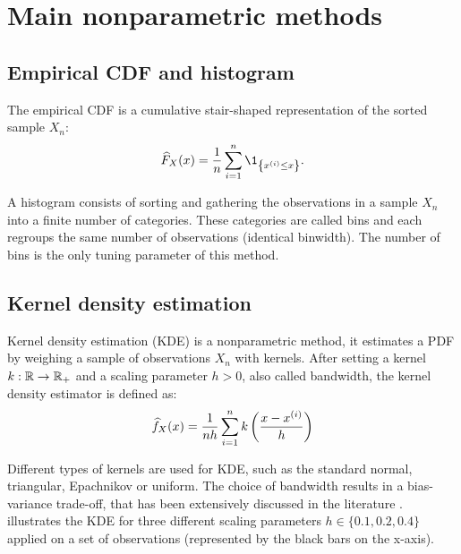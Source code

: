 \section*{Main nonparametric methods}


\subsection*{Empirical CDF and histogram}
The empirical CDF is a cumulative stair-shaped representation of the sorted sample $X_n$:
\begin{equation}
    \what{F}_X(x) = \frac1n \sum_{i=1}^{n} \1_{\left\{x^{(i)} \leq x\right\}}.
\end{equation}

A histogram consists of sorting and gathering the observations in a sample $X_n$ into a finite number of categories. 
These categories are called bins and each regroups the same number of observations (identical binwidth). 
The number of bins is the only tuning parameter of this method.

\subsection*{Kernel density estimation}
Kernel density estimation (KDE) is a nonparametric method, it estimates a PDF by weighing a sample of observations $X_n$ with kernels.  
After setting a kernel $k: \mathbb{R} \rightarrow \mathbb{R}_+$ and a scaling parameter $h>0$, also called bandwidth, the kernel density estimator is defined as:
\begin{equation}
    \widehat{f}_X(x) = \frac{1}{n h}\sum_{i=1}^{n} k\left(\frac{x - x^{(i)}}{h}\right)
\end{equation}

Different types of kernels are used for KDE, such as the standard normal, triangular, Epachnikov or uniform. 
The choice of bandwidth results in a bias-variance trade-off, that has been extensively discussed in the literature \citep{wand_jones_1994_kde}.
 illustrates the KDE for three different scaling parameters $h\in\{0.1, 0.2, 0.4\}$ applied on a set of observations (represented by the black bars on the x-axis). 

